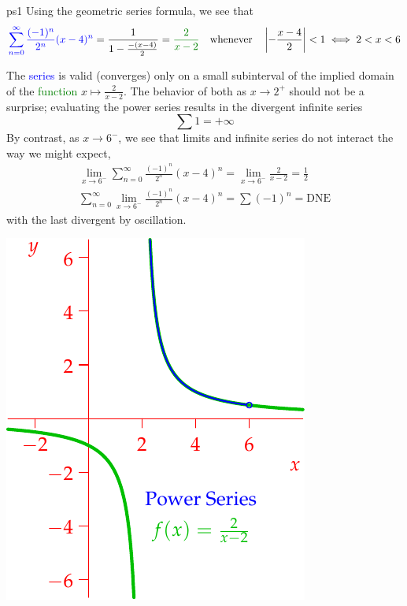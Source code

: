 \begin{example}{}{ps1}
Using the geometric series formula, we see that
\begin{gather*}\label{ex:bob}
\textcolor{blue}{\sum_{n=0}^\infty \frac{(-1)^n}{2^n}(x-4)^n}=\frac 1{1-\frac{-(x-4)}2} =\textcolor{Green}{\frac 2{x-2}} \quad
\text{whenever}\quad\nm{-\frac{x-4}2}<1\iff 2<x<6
\end{gather*}
\begin{minipage}[t]{0.6\linewidth}\vspace{0pt}
The \textcolor{blue}{series} is valid (converges) only on a small subinterval of the implied domain of the \textcolor{Green}{function} $x\mapsto \frac 2{x-2}$. The behavior of both as $x\to 2^+$ should not be a surprise; evaluating the power series results in the divergent infinite series
\[\sum 1=+\infty\]
By contrast, as $x\to 6^-$, we see that limits and infinite series do not interact the way we might expect,
\begin{gather*}
\lim\limits_{x\to 6^-}\sum_{n=0}^\infty \frac{(-1)^n}{2^n}(x-4)^n=\lim\limits_{x\to 6^-}\frac 2{x-2}=\frac 12\\
\sum_{n=0}^\infty \lim\limits_{x\to 6^-}\frac{(-1)^n}{2^n}(x-4)^n =\sum (-1)^n =\text{DNE}
\end{gather*}
with the last divergent by oscillation.
\end{minipage}\begin{minipage}[t]{0.4\linewidth}\vspace{0pt}
\flushright\includegraphics{powerseriesex}
\end{minipage}
\end{example}

